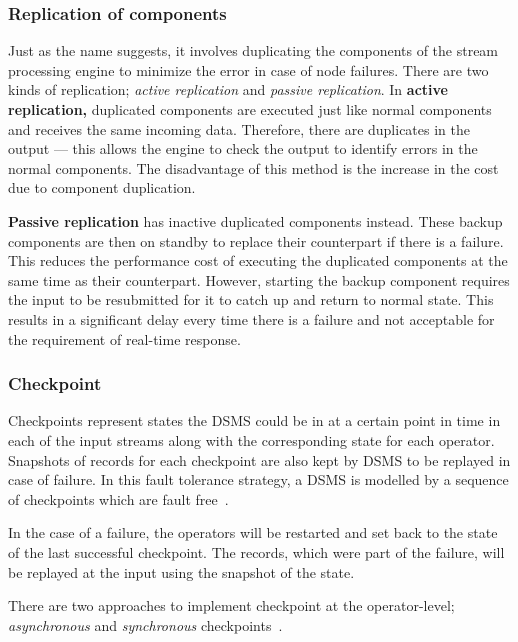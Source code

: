 \subsubsection{Replication of components}
Just as the name suggests, it involves duplicating the components of the stream processing
engine to minimize the error in case of node failures. There are two kinds of replication; 
\emph{active replication} and \emph{passive replication}. In \textbf{active replication,}
duplicated components are executed just like normal components and receives the same incoming data. 
Therefore, there are duplicates in the output --- this allows the engine to check the 
output to identify errors in the normal components. The disadvantage of this method is 
the increase in the cost due to component duplication. 

\textbf{Passive replication} has inactive duplicated components instead. These backup
components are then on standby to replace their counterpart if there is a failure. This 
reduces the performance cost of executing the duplicated components at the same 
time as their counterpart. However, starting the backup component requires the input 
to be resubmitted for it to catch up and return to normal state. This results in a significant 
delay every time there is a failure and not acceptable for the requirement of real-time response. 


\subsubsection{Checkpoint}

Checkpoints represent states the DSMS could be in at a certain point in 
time in each of the input streams along with the corresponding 
state for each operator. Snapshots of records for each checkpoint are also kept 
by DSMS to be replayed in case of failure. 
In this fault tolerance strategy, a DSMS is modelled by a sequence of 
checkpoints which are fault free~\cite{fault_tolerance_dsms}. 

In the case of a failure, the operators will be restarted and set back to the state of the 
last successful checkpoint. The records, which were part of the failure, will be replayed
at the input using the snapshot of the state. 

There are two approaches to implement checkpoint at the operator-level; 
\emph{asynchronous} and \emph{synchronous} checkpoints~\cite{fault_tolerance_dsms}.

